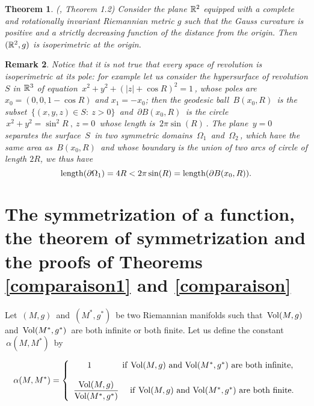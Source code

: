 \documentclass[11pt, reqno]{amsart}
\newtheorem{theoreme}{Theorem}[section]
\newtheorem{remarque}[theoreme]{Remark}
\theoremstyle{plain}
\begin{document}
\begin{theoreme}
(\cite{MO}, Theorem 1.2) Consider the plane ${\Bbb{R}}^2$ equipped with a complete and   rotationally invariant Riemannian metric $g$ such that the Gauss curvature is positive and a strictly decreasing function of the distance  from the origin. Then $({\Bbb{R}}^2, g)$ is isoperimetric at  the origin.
\end{theoreme}
\begin{remarque}\rm
Notice  that it is not true that every space of revolution 
is isoperimetric at its pole: for example 
let us consider the hypersurface of revolution $S$ in ${\Bbb{R}}^3$ of equation $\, x^2 + y^2 + ( |z| + \cos R)^2 = 1\,$, whose poles are $x_0 =(0,0,1-\cos R)$ and $x_1= -x_0$; then the geodesic ball $\,B(x_0 , R) \,$ is the subset $\, \{(x,y,z) \in S:\ z>0\}\,$ and $\,\partial B(x_0 , R) \,$
is the circle $\, x^2 + y^2 = \sin^2 R \ ,\ z=0\,$ whose length is $\,2\pi \sin (R)\,$.
The plane $\,y = 0\,$ separates the surface $\,S\,$ in two symmetric domains 
 $\,\Omega_1\,$ and $\,\Omega_2\,$, which have the same area as $\,B(x_0 , R) \,$ and whose boundary is the union of two arcs of circle of length $2 R$, we thus have 
$${\rm length} (\partial \Omega_1) = 4 R < 2\pi \sin (R) = {\rm length} (\partial B(x_0 , R)).$$
\end{remarque}

\section{The symmetrization of a function, the  theorem of symmetrization and the  proofs of Theorems \ref{comparaison1} and \ref{comparaison}}\label{compsameman}
Let $\,(M,g)\,$ and $\,(M^*,g^*)\,$ be two Riemannian manifolds such that $\,{\rm Vol}(M,g)\,$ 
and $\,{\rm Vol}(M^*,g^*)\,$ are both infinite or both finite. Let us define the constant 
$\,\alpha (M, M^*)\,$ by

$$\alpha (M, M^*) =  \left\{\begin{array}{l}
\ \ \ \ \ 1 \ \ \ \ \ \ \ \ \ \ \  {\rm if \  Vol} (M,g) \  {\rm and \  Vol} (M^*,g^*) \ 
{\rm are\ both\ infinite},\\  \\ 
\dfrac{{\rm Vol}(M,g)}{{\rm Vol}(M^*,g^*)} \ \ \ \  {\rm if \  Vol} (M,g) \  
{\rm and \  Vol} (M^*,g^*) \ {\rm are\ both\ finite.}\end{array}\right.$$
\end{document}
